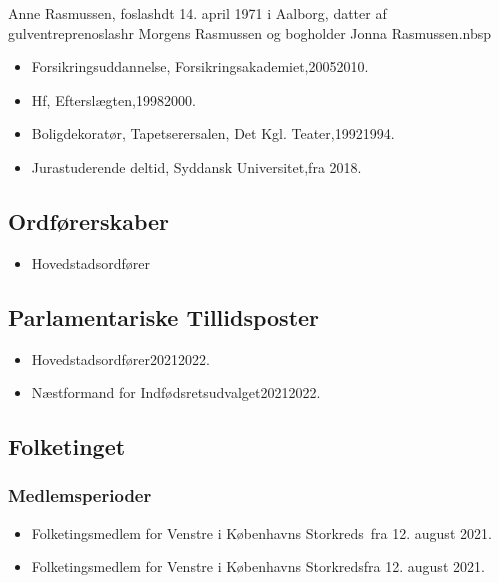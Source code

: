 \documentclass[11pt, a4paper]{awesome-cv}
\begin{document}
\makecvheader[R]
\makelettertitle
\begin{cvletter}
Anne Rasmussen, foslashdt 14. april 1971 i Aalborg, datter af gulventreprenoslashr Morgens Rasmussen og bogholder Jonna Rasmussen.nbsp

\begin{itemize}
\item Forsikringsuddannelse, Forsikringsakademiet,20052010.
\item Hf, Efterslægten,19982000.
\item Boligdekoratør, Tapetserersalen, Det Kgl. Teater,19921994.
\item Jurastuderende deltid, Syddansk Universitet,fra 2018.
\end{itemize}
\subsection*{Ordførerskaber}
\begin{itemize}
\item Hovedstadsordfører
\end{itemize}
\subsection*{Parlamentariske Tillidsposter}
\begin{itemize}
\item Hovedstadsordfører20212022.
\item Næstformand for Indfødsretsudvalget20212022.
\end{itemize}
\subsection*{Folketinget}
\subsubsection*{Medlemsperioder}
\begin{itemize}
\item Folketingsmedlem for Venstre i Københavns Storkreds fra 12. august 2021.
\item Folketingsmedlem for Venstre i Københavns Storkredsfra 12. august 2021.
\end{itemize}

\end{cvletter}
\end{document}
